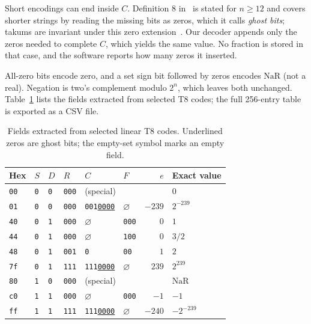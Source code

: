 \documentclass[conference]{IEEEtran}
\newcommand{\NaR}{\mathrm{NaR}}
\newcommand{\code}[1]{\texttt{#1}}
\begin{document}
Short encodings can end inside $C$. Definition 8 in~\cite{takum} is stated for
$n\ge 12$ and covers shorter strings by reading the missing bits as zeros, which
it calls \emph{ghost bits}; takums are invariant under this zero
extension~\cite{simd}. Our decoder appends only the zeros needed to complete
$C$, which yields the same value. No fraction is stored in that case, and the
software reports how many zeros it inserted.

All-zero bits encode zero, and a set sign bit followed by zeros encodes $\NaR$
(not a real). Negation is two's complement modulo $2^n$, which leaves both
unchanged. Table~\ref{tab:examples} lists the fields extracted from selected T8 codes;
the full 256-entry table is exported as a CSV file.

\begin{table}[t]
\caption{Fields extracted from selected linear T8 codes. Underlined zeros
are ghost bits; the empty-set symbol marks an empty field.}
\label{tab:examples}
\centering
\setlength{\tabcolsep}{4pt}
\begin{tabular}{llllllrl}
\toprule
Hex & $S$ & $D$ & $R$ & $C$ & $F$ & $e$ & Exact value\\
\midrule
\code{00} & \code{0} & \code{0} & \code{000} & \multicolumn{3}{l}{(special)} & $0$\\
\code{01} & \code{0} & \code{0} & \code{000} & \code{001\underline{0000}} & $\varnothing$ & $-239$ & $2^{-239}$\\
\code{40} & \code{0} & \code{1} & \code{000} & $\varnothing$ & \code{000} & $0$ & $1$\\
\code{44} & \code{0} & \code{1} & \code{000} & $\varnothing$ & \code{100} & $0$ & $3/2$\\
\code{48} & \code{0} & \code{1} & \code{001} & \code{0} & \code{00} & $1$ & $2$\\
\code{7f} & \code{0} & \code{1} & \code{111} & \code{111\underline{0000}} & $\varnothing$ & $239$ & $2^{239}$\\
\code{80} & \code{1} & \code{0} & \code{000} & \multicolumn{3}{l}{(special)} & $\NaR$\\
\code{c0} & \code{1} & \code{1} & \code{000} & $\varnothing$ & \code{000} & $-1$ & $-1$\\
\code{ff} & \code{1} & \code{1} & \code{111} & \code{111\underline{0000}} & $\varnothing$ & $-240$ & $-2^{-239}$\\
\bottomrule
\end{tabular}
\end{table}
\end{document}
